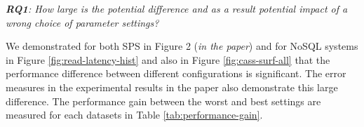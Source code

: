 \documentclass[letter]{vldb}
\begin{document}
{\noindent \em \textbf{RQ1}: How large is the potential difference and as a result potential impact of a wrong choice of parameter settings?}

We demonstrated for both SPS in Figure 2 (\emph{in the paper}) and for NoSQL systems in Figure \ref{fig:read-latency-hist} and also in Figure \ref{fig:cass-surf-all} that the performance difference between different configurations is significant. The error measures in the experimental results in the paper also demonstrate this large difference. The performance gain between the worst and best settings are measured for each datasets in Table \ref{tab:performance-gain}.

\begin{table}[h]
	\centering
	\caption{Performance gain between best and worst settings.} %
	\label{tab:performance-gain}
\end{table}
\end{document}
